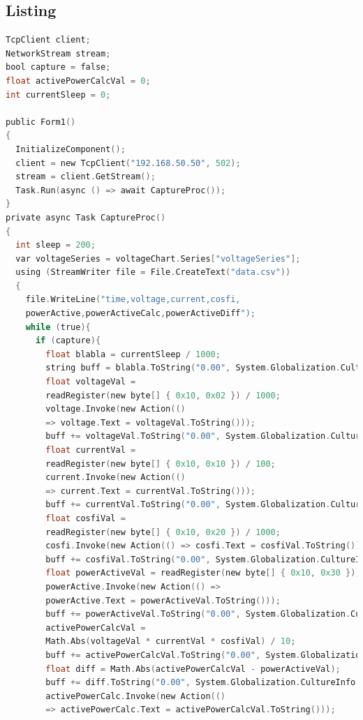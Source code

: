 \documentclass[12pt]{article}
\begin{document}
\subsection{Listing}
\begin{lstlisting}[language=C, caption=Klasa Form zarządzająca odczytywaniem danych]
TcpClient client;
NetworkStream stream;
bool capture = false;
float activePowerCalcVal = 0;
int currentSleep = 0;

public Form1()
{
  InitializeComponent();
  client = new TcpClient("192.168.50.50", 502);
  stream = client.GetStream();
  Task.Run(async () => await CaptureProc());
}
private async Task CaptureProc()
{
  int sleep = 200;
  var voltageSeries = voltageChart.Series["voltageSeries"];
  using (StreamWriter file = File.CreateText("data.csv"))
  {
    file.WriteLine("time,voltage,current,cosfi,
    powerActive,powerActiveCalc,powerActiveDiff");
    while (true){
      if (capture){
        float blabla = currentSleep / 1000;
        string buff = blabla.ToString("0.00", System.Globalization.CultureInfo.InvariantCulture);
        float voltageVal = 
        readRegister(new byte[] { 0x10, 0x02 }) / 1000;
        voltage.Invoke(new Action(()
        => voltage.Text = voltageVal.ToString()));
        buff += voltageVal.ToString("0.00", System.Globalization.CultureInfo.InvariantCulture) + ",";
        float currentVal = 
        readRegister(new byte[] { 0x10, 0x10 }) / 100;
        current.Invoke(new Action(() 
        => current.Text = currentVal.ToString()));
        buff += currentVal.ToString("0.00", System.Globalization.CultureInfo.InvariantCulture) + ",";
        float cosfiVal = 
        readRegister(new byte[] { 0x10, 0x20 }) / 1000;
        cosfi.Invoke(new Action(() => cosfi.Text = cosfiVal.ToString()));
        buff += cosfiVal.ToString("0.00", System.Globalization.CultureInfo.InvariantCulture) + ",";
        float powerActiveVal = readRegister(new byte[] { 0x10, 0x30 });
        powerActive.Invoke(new Action(() => 
        powerActive.Text = powerActiveVal.ToString()));
        buff += powerActiveVal.ToString("0.00", System.Globalization.CultureInfo.InvariantCulture) + ",";
        activePowerCalcVal =
        Math.Abs(voltageVal * currentVal * cosfiVal) / 10;
        buff += activePowerCalcVal.ToString("0.00", System.Globalization.CultureInfo.InvariantCulture) + ",";
        float diff = Math.Abs(activePowerCalcVal - powerActiveVal);
        buff += diff.ToString("0.00", System.Globalization.CultureInfo.InvariantCulture);
        activePowerCalc.Invoke(new Action(() 
        => activePowerCalc.Text = activePowerCalcVal.ToString()));

\end{lstlisting}
\end{document}
